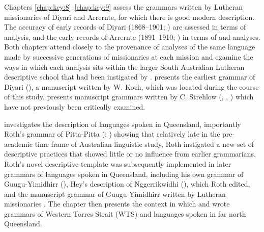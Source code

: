 Chapters \ref{chap:key:8}–\ref{chap:key:9} assess the grammars written by Lutheran missionaries of Diyari and Arrernte, for which there is good modern description. The accuracy of early records of Diyari (1868--1901; ) are assessed in terms of  analysis, and the early records of Arrernte (1891--1910; ) in terms of  and  analyses. Both chapters attend closely to the provenance of analyses of the same language made by successive generations of missionaries at each mission and examine the ways in which each analysis sits within the larger South Australian Lutheran descriptive school that had been instigated by \citet{teichelmann_outlines_1840}.  presents the earliest grammar of Diyari (\citeyear{koch_untitled_1868}), a manuscript written by W. Koch, which was located during the course of this study.  presents manuscript grammars written by C. Strehlow (\citeyear{strehlow_untitled_1931}, \citeyear{strehlow_grammatik_1931}, \citeyear{strehlow_notitle_1910}) which have not previously been critically examined. 

 investigates the description of languages spoken in Queensland, importantly Roth’s grammar of Pitta-Pitta (\citeyear{roth_ethnological_1897}; ) showing that relatively late in the pre-academic time frame of Australian linguistic study, Roth instigated a new set of descriptive practices that showed little or no influence from earlier grammarians. Roth’s novel descriptive template was subsequently implemented in later grammars of languages spoken in Queensland, including his own grammar of Guugu{\hyp}Yimidhirr (\citeyear{roth_structure_1901}), Hey’s description of Nggerrikwidhi (\citeyear{hey_elementary_1903}), which Roth edited, and the manuscript grammar of Guugu{\hyp}Yimidhirr written by Lutheran missionaries \citet{schwarz_koko_1900}. The chapter then presents the context in which \citet{ray_study_1893} and \citet{ray_linguistics_1907} wrote grammars of Western Torres Strait (WTS) and languages spoken in far north Queensland.
